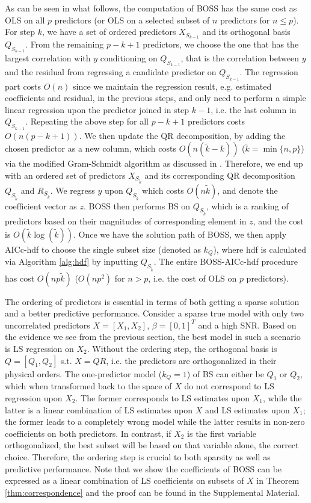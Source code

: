 As can be seen in what follows, the computation of BOSS has the same cost as OLS on all $p$ predictors (or OLS on a selected subset of $n$ predictors for $n \le p$). For step $k$, we have a set of ordered predictors $X_{S_{k-1}}$ and its orthogonal basis $Q_{S_{k-1}}$. From the remaining $p-k+1$ predictors, we choose the one that has the largest correlation with $y$ conditioning on $Q_{S_{k-1}}$, that is the correlation between $y$ and the residual from regressing a candidate predictor on $Q_{S_{k-1}}$. The regression part costs $O(n)$ since we maintain the regression result, e.g. estimated coefficients and residual, in the previous steps, and only need to perform a simple linear regression upon the predictor joined in step $k-1$, i.e. the last column in $Q_{S_{k-1}}$. Repeating the above step for all $p-k+1$ predictors costs $O(n(p-k+1))$. We then update the QR decomposition, by adding the chosen predictor as a new column, which costs $O(n(\tilde{k}-k))$ ($\tilde{k}=\min\{n, p\}$) via the modified Gram-Schmidt algorithm as discussed in \citet{hammarling2008updating}. Therefore, we end up with an ordered set of predictors $X_{S_{\tilde{k}}}$ and its corresponding QR decomposition $Q_{S_{\tilde{k}}}$ and $R_{S_{\tilde{k}}}$. We regress $y$ upon $Q_{S_{\tilde{k}}}$ which costs $O(n\tilde{k})$, and denote the coefficient vector as $z$. BOSS then performs BS on $Q_{S_{\tilde{k}}}$, which is a ranking of predictors based on their magnitudes of corresponding element in $z$, and the cost is $O(\tilde{k}\log(\tilde{k}))$. Once we have the solution path of BOSS, we then apply AICc-hdf to choose the single subset size (denoted as $k_Q$), where hdf is calculated via Algorithm \ref{alg:hdf} by inputting $Q_{S_{\tilde{k}}}$. The entire BOSS-AICc-hdf procedure has cost $O(np \tilde{k})$ ($O(np^2)$ for $n>p$, i.e. the cost of OLS on $p$ predictors). 

The ordering of predictors is essential in terms of both getting a sparse solution and a better predictive performance. Consider a sparse true model with only two uncorrelated predictors $X=[X_1,X_2]$, $\beta=[0,1]^T$ and a high SNR. Based on the evidence we see from the previous section, the best model in such a scenario is LS regression on $X_2$. Without the ordering step, the orthogonal basis is $Q=[Q_1,Q_2]$ s.t. $X=QR$, i.e. the predictors are orthogonalized in their physical orders. The one-predictor model ($k_Q=1$) of BS can either be $Q_1$ or $Q_2$, which when transformed back to the space of $X$ do not correspond to LS regression upon $X_2$. The former corresponds to LS estimates upon $X_1$, while the latter is a linear combination of LS estimates upon $X$ and LS estimates upon $X_1$; the former leads to a completely wrong model while the latter results in non-zero coefficients on both predictors. In contrast, if $X_2$ is the first variable orthogonalized, the best subset will be based on that variable alone, the correct choice. Therefore, the ordering step is crucial to both sparsity as well as predictive performance. Note that we show the coefficients of BOSS can be expressed as a linear combination of LS coefficients on subsets of $X$ in Theorem \ref{thm:correspondence} and the proof can be found in the Supplemental Material. 

